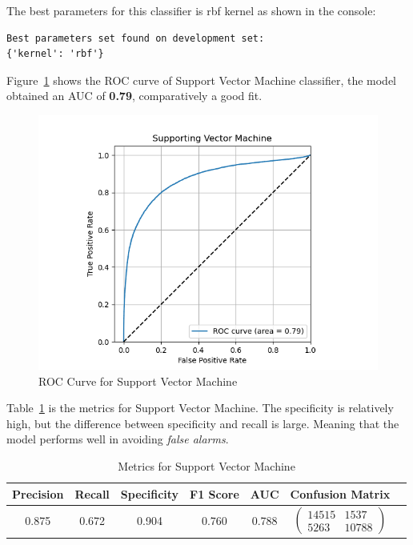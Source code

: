 The best parameters for this classifier is rbf kernel as shown in the console:

\begin{verbatim}
Best parameters set found on development set:
{'kernel': 'rbf'}
\end{verbatim}

Figure~\ref{fig:roc-svm} shows the ROC curve of Support Vector Machine classifier, the model obtained an AUC of \textbf{0.79}, comparatively a good fit.

\begin{figure}
    \centering
    \includegraphics[width=1\linewidth]{docs//assets/individual_roc_curve_Supporting Vector Machine.png}
    \caption{ROC Curve for Support Vector Machine}
    \label{fig:roc-svm}
\end{figure}

Table~\ref{tab:svm} is the metrics for Support Vector Machine. The specificity is relatively high, but the difference between specificity and recall is large. Meaning that the model performs well in avoiding \textit{false alarms}.

\begin{table}
\centering
\begin{tabular}{|c|c|c|c|c|c|c}
\hline
\textbf{Precision} & \textbf{Recall} & \textbf{Specificity} & \textbf{F1 Score} & \textbf{AUC} & \textbf{Confusion Matrix} \\
\hline
0.875 & 0.672 & 0.904 & 0.760 & 0.788 & $\left(\begin{array}{cc} 14515 & 1537 \\ 5263 & 10788 \end{array}\right)$ \\ 
\hline
\end{tabular}
\caption{Metrics for Support Vector Machine}
\label{tab:svm}
\end{table}


